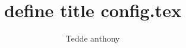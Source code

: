 \author{Tedde anthony}
\title{define title config.tex}
\date{}

\addtocounter{tocdepth}{3}
\setcounter{secnumdepth}{3}

